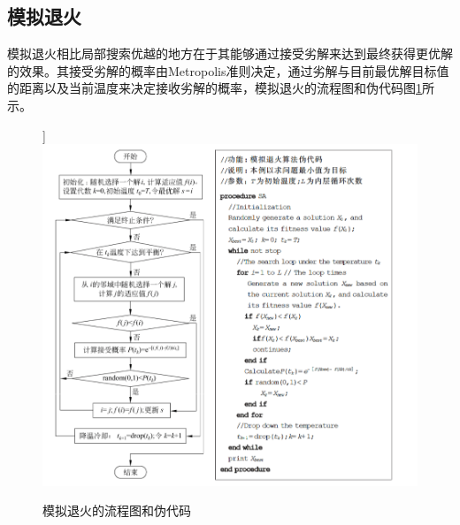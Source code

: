 \documentclass[withoutpreface,bwprint]{cumcmthesis} %
\begin{document}
\subsection{模拟退火}
	模拟退火相比局部搜索优越的地方在于其能够通过接受劣解来达到最终获得更优解的效果。其接受劣解的概率由Metropolis准则决定，通过劣解与目前最优解目标值的距离以及当前温度来决定接收劣解的概率，模拟退火的流程图和伪代码图\ref{flow}所示。
	\begin{figure}[htbp]]
		\centering
		\includegraphics[width=1\linewidth]{sa_flow}
		\caption{模拟退火的流程图和伪代码}
		\label{flow}
	\end{figure}
		
\end{document}
